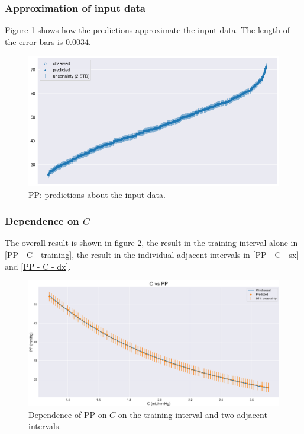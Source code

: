 \vspace{-0.5cm}

\subsubsection{Approximation of input data}
Figure \ref{PP - inference} shows how the predictions approximate the input data. The length of the error bars is $0.0034$.

\begin{figure}[h]
    \centering
    \includegraphics[width=1\textwidth]{images/Training (risultati)/PP/PP - inference.png}
    \caption{PP: predictions about the input data.}
    \label{PP - inference}
\end{figure}



\subsubsection{Dependence on $C$}
The overall result is shown in figure \ref{PP - C - full}, the result in the training interval alone in \ref{PP - C - training}, the result in the individual adjacent intervals in \ref{PP - C - sx} and \ref{PP - C - dx}.

\vspace{1cm}

\begin{figure}[!htb]
    \centering
    \includegraphics[width=1\textwidth]{images/Training (risultati)/PP/PP - C - full.pdf}
    \caption{Dependence of PP on $C$ on the training interval and two adjacent intervals.}
    \label{PP - C - full}
\end{figure}

